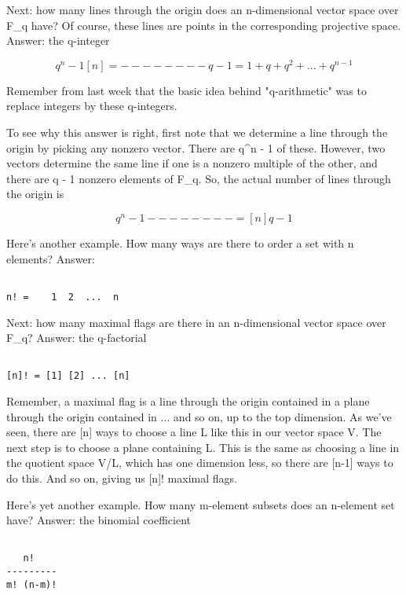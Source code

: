 Next: how many lines through the origin does an n-dimensional vector
space over F_{q} have?  Of course, these lines are points in the
corresponding projective space.  Answer: the q-integer


$$

          q^{n} - 1
[n]  =   --------   
           q - 1

     = 1 + q + q^{2} + ... + q^{n-1}
$$
    
Remember from last week that the basic idea behind "q-arithmetic" was
to replace integers by these q-integers.  

To see why this answer is right, first note that we determine a line
through the origin by picking any nonzero vector.  There are q^{n} - 1
of these.  However, two vectors determine the same line if one is a
nonzero multiple of the other, and there are q - 1 nonzero elements 
of F_{q}.  So, the actual number of lines through the origin is


$$

 q^{n} - 1
-------- = [n]
 q - 1
$$
    
Here's another example.  How many ways are there to order a set with n
elements?  Answer:


\begin{verbatim}

n! =    1  2  ...  n
\end{verbatim}
    
Next: how many maximal flags are there in an n-dimensional vector space
over F_{q}?  Answer: the q-factorial 


\begin{verbatim}

[n]! = [1] [2] ... [n]
\end{verbatim}
    
Remember, a maximal flag is a line through the origin contained in a
plane through the origin contained in ... and so on, up to the top
dimension.  As we've seen, there are [n] ways to choose a line L like
this in our vector space V.  The next step is to choose a plane
containing L.  This is the same as choosing a line in the quotient space
V/L, which has one dimension less, so there are [n-1] ways to do this. 
And so on, giving us [n]! maximal flags.

Here's yet another example.  How many m-element subsets does an
n-element set have?  Answer: the binomial coefficient 


\begin{verbatim}

   n! 
---------
m! (n-m)!
\end{verbatim}
    
